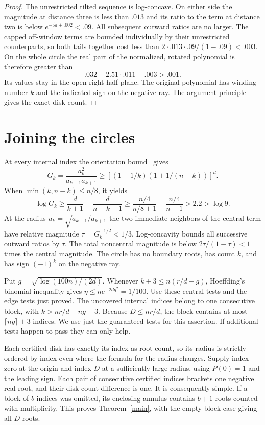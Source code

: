 \documentclass[11pt]{article}
\begin{document}
\begin{proof}
The unrestricted tilted sequence is log-concave. On either side the magnitude at distance three is less than $.013$ and its ratio to the term at distance two is below $e^{-5a+.002}<.09$. All subsequent outward ratios are no larger. The capped off-window terms are bounded individually by their unrestricted counterparts, so both tails together cost less than $2\cdot .013\cdot .09/(1-.09)<.003$. On the whole circle the real part of the normalized, rotated polynomial is therefore greater than
\[
 .032-2.51\cdot.011-.003>.001 .
\]
Its values stay in the open right half-plane. The original polynomial has winding number $k$ and the indicated sign on the negative ray. The argument principle gives the exact disk count.
\end{proof}

\section{Joining the circles}
At every internal index the orientation bound~\cite{orientation} gives
\[
 G_k=\frac{a_k^2}{a_{k-1}a_{k+1}}\ge
 \left[(1+1/k)(1+1/(n-k))\right]^d .
\]
When $\min(k,n-k)\le n/8$, it yields
\[
 \log G_k\ge\frac{d}{k+1}+\frac{d}{n-k+1}
 \ge \frac{n/4}{n/8+1}+\frac{n/4}{n+1}>2.2>\log9 .
\]
At the radius $u_k=\sqrt{a_{k-1}/a_{k+1}}$ the two immediate neighbors of the central term have relative magnitude $\tau=G_k^{-1/2}<1/3$. Log-concavity bounds all successive outward ratios by $\tau$. The total noncentral magnitude is below $2\tau/(1-\tau)<1$ times the central magnitude. The circle has no boundary roots, has count $k$, and has sign $(-1)^k$ on the negative ray.

Put $g=\sqrt{\log(100n)/(2d)}$. Whenever $k+3\le n(r/d-g)$, Hoeffding's binomial inequality gives $\eta\le n e^{-2dg^2}=1/100$. Use these central tests and the edge tests just proved. The uncovered internal indices belong to one consecutive block, with $k>nr/d-ng-3$. Because $D\le nr/d$, the block contains at most $\lceil ng\rceil+3$ indices. We use just the guaranteed tests for this assertion. If additional tests happen to pass they can only help.

Each certified disk has exactly its index as root count, so its radius is strictly ordered by index even where the formula for the radius changes. Supply index zero at the origin and index $D$ at a sufficiently large radius, using $P(0)=1$ and the leading sign. Each pair of consecutive certified indices brackets one negative real root, and their disk-count difference is one. It is consequently simple. If a block of $b$ indices was omitted, its enclosing annulus contains $b+1$ roots counted with multiplicity. This proves Theorem~\ref{main}, with the empty-block case giving all $D$ roots.
\end{document}
